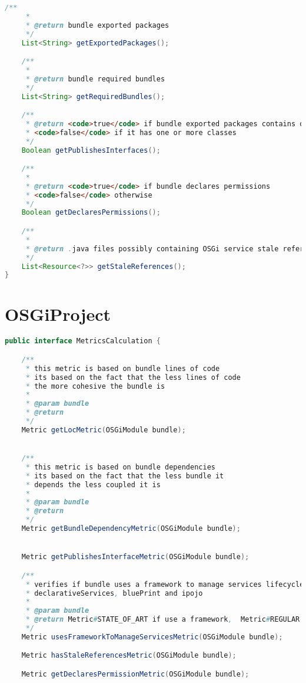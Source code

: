 \begin{appendices}
\begin{lstlisting}[language=java,label=Intrabundle OSGiModule,caption=Intrabundle OSGiModule interface]
    /**
     *
     * @return bundle exported packages
     */
    List<String> getExportedPackages();

    /**
     *
     * @return bundle required bundles
     */
    List<String> getRequiredBundles();

    /**
     * @return <code>true</code> if bundle exported packages contains only interfaces
     * <code>false</code> if it has one or more classes
     */
    Boolean getPublishesInterfaces();

    /**
     *
     * @return <code>true</code> if bundle declares permissions
     * <code>false</code> otherwise
     */
    Boolean getDeclaresPermissions();

    /**
     *
     * @return .java files possibly containing OSGi service stale references
     */
    List<Resource<?>> getStaleReferences();
}
\end{lstlisting}
\FloatBarrier

\section{OSGiProject}
\begin{lstlisting}[language=java, caption=Intrabundle MetricsCalculator interface]
public interface MetricsCalculation {

    /**
     * this metric is based on bundle lines of code
     * its based on the fact that the less lines of code
     * the more cohesive the bundle is
     *
     * @param bundle
     * @return
     */
    Metric getLocMetric(OSGiModule bundle);


    /**
     * this metric is based on bundle dependencies
     * its based on the fact that the less bundle it
     * depends the less coupled it is
     *
     * @param bundle
     * @return
     */
    Metric getBundleDependencyMetric(OSGiModule bundle);


    Metric getPublishesInterfaceMetric(OSGiModule bundle);

    /**
     * verifies if bundle uses a framework to manage services lifecycle, frameworks being tracker are:
     * declarativeServices, bluePrint and ipojo
     *
     * @param bundle
     * @return Metric#STATE_OF_ART if use a framework,  Metric#REGULAR if no framework is used
     */
    Metric usesFrameworkToManageServicesMetric(OSGiModule bundle);

    Metric hasStaleReferencesMetric(OSGiModule bundle);

    Metric getDeclaresPermissionMetric(OSGiModule bundle);


\end{lstlisting}
\end{appendices}
